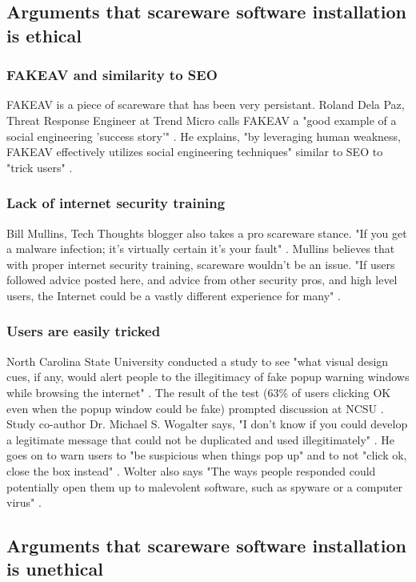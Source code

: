 \documentclass[11pt]{article}
\begin{document}
\begin{multicols}{2}
\subsection{Arguments that scareware software installation is ethical}
\subsubsection{FAKEAV and similarity to SEO}
FAKEAV is a piece of scareware that has been very persistant. Roland Dela Paz, Threat Response Engineer at Trend Micro calls FAKEAV a "good example of a social engineering 'success story'" \cite{malwareblogfakeav}. He explains, "by leveraging human weakness, FAKEAV effectively utilizes social engineering techniques" similar to SEO to "trick users" \cite{malwareblogfakeav}.
\subsubsection{Lack of internet security training}
Bill Mullins, Tech Thoughts blogger also takes a pro scareware stance. "If you get a malware infection; it's virtually certain it's your fault" \cite{billmullins}. Mullins believes that with proper internet security training, scareware wouldn't be an issue. "If users followed advice posted here, and advice from other security pros, and high level users, the Internet could be a vastly different experience for many" \cite{billmullins}.
\subsubsection{Users are easily tricked}
North Carolina State University conducted a study to see "what visual design cues, if any, would alert people to the illegitimacy of fake popup warning windows while browsing the internet" \cite{ncsupaper}. The result of the test (63\% of users clicking OK even when the popup window could be fake) prompted discussion at NCSU \cite{ncsupaper}. Study co-author Dr. Michael S. Wogalter says, "I don't know if you could develop a legitimate message that could not be duplicated and used illegitimately" \cite{ncsupaper}. He goes on to warn users to "be suspicious when things pop up" and to not "click ok, close the box instead" \cite{ncsupaper}. Wolter also says "The ways people responded could potentially open them up to malevolent software, such as spyware or a computer virus" \cite{ncsupaper}.
\subsection{Arguments that scareware software installation is unethical}

\end{multicols}
\end{document}
